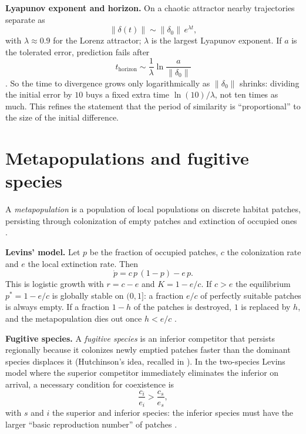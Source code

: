\textbf{Lyapunov exponent and horizon.}
On a chaotic attractor nearby trajectories
separate as
$$
\|\delta(t)\| \sim \|\delta_0\|\,
e^{\lambda t},
$$
with $\lambda\approx 0.9$ for the Lorenz
attractor; $\lambda$ is the largest
Lyapunov exponent. If $a$ is the tolerated
error, prediction fails after
$$
t_{\mathrm{horizon}} \sim
\frac{1}{\lambda}\ln\frac{a}{\|\delta_0\|}
$$
\cite[Section 9.3]{strogatz1994nonlinear}.
So the time to divergence grows only
logarithmically as $\|\delta_0\|$
shrinks: dividing the initial error by $10$
buys a fixed extra time $\ln(10)/\lambda$,
not ten times as much. This refines
the statement that the period of
similarity is ``proportional'' to the size
of the initial difference.

\section{Metapopulations and fugitive
species}
\label{section-metapopulations}

A \emph{metapopulation} is a population of
local populations on discrete habitat
patches, persisting through colonization of
empty patches and extinction of occupied
ones \cite{nee2007metapopulations}.

\textbf{Levins' model.}
Let $p$ be the fraction of occupied
patches, $c$ the colonization rate and $e$
the local extinction rate. Then
\begin{equation}
\label{equation-levins}
\dot p = c\,p\,(1-p) - e\,p .
\end{equation}
This is logistic growth with
$r = c-e$ and $K = 1-e/c$. If $c>e$ the
equilibrium $p^* = 1-e/c$ is globally
stable on $(0,1]$: a fraction $e/c$ of
perfectly suitable patches is always empty.
If a fraction $1-h$ of the patches is
destroyed, $1$ is replaced by $h$, and the
metapopulation dies out once $h<e/c$
\cite[Section 4.2]{nee2007metapopulations}.

\textbf{Fugitive species.}
A \emph{fugitive species} is an inferior
competitor that persists regionally because
it colonizes newly emptied patches faster
than the dominant species displaces it
(Hutchinson's idea, recalled in
\cite{armstrong1976fugitive}). In the
two-species Levins model where the superior
competitor immediately eliminates the
inferior on arrival, a necessary condition
for coexistence is
$$
\frac{c_i}{e_i} > \frac{c_s}{e_s},
$$
with $s$ and $i$ the superior and inferior
species: the inferior species must have the
larger ``basic reproduction number'' of
patches
\cite[Section 4.4]{nee2007metapopulations}.

